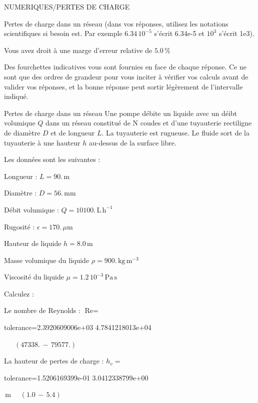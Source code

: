 \documentclass[12pt]{article}
\begin{document}
\begin{quiz}{NUMERIQUES/PERTES DE CHARGE}
\begin{cloze}{Pertes de charge dans un réseau}
(dans vos réponses, utilisez les notations scientifiques si besoin est. Par exemple $6.34\, 10^{-5}$ s'écrit 6.34e-5 et $10^{3}$ s'écrit 1e3).

Vous avez droit à une marge d'erreur relative de $5.0\, \% $

Des fourchettes indicatives vous sont fournies en face de chaque réponse. Ce ne sont que des ordres de grandeur pour vous inciter à vérifier vos calculs avant de valider vos réponses, et la bonne réponse peut sortir légèrement de l'intervalle indiqué.

\end{cloze} 


 \begin{cloze}{Pertes de charge dans un réseau} 
Une pompe débite un liquide avec un déibt volumique $Q$ dans un réseau constitué de N coudes et d'une tuyauterie rectiligne de diamètre $D$ et de longueur $L$. La tuyauterie est rugueuse. Le fluide sort de la tuyauterie à une hauteur $h$ au-dessus de la surface libre.

Les données sont les suivantes :

Longueur : $L = 90.\,  \mathrm{m} $

Diamètre : $D = 56.\,  \mathrm{mm} $

Débit volumique : $Q = 10100.\,  \mathrm{L}\,  \mathrm{h}^{-1} $

Rugosité : $\epsilon = 170.\, \mu \mathrm{m} $

Hauteur de liquide $h = 8.0\,  \mathrm{m} $

Masse volumique du liquide $\rho = 900.\,  \mathrm{kg}\,  \mathrm{m}^{-3} $

Viscosité du liquide $\mu =  1.2 \, 10^{-3} \,  \mathrm{Pa}\,  \mathrm{s} $

 

Calculez :

 

Le nombre de Reynolds : $\text{Re} =  $
\begin{numerical}[points=1] 
\item[tolerance={2.3920609006e+03}] 4.7841218013e+04 
\end{numerical} 
 $\,$ 
 $ \quad (47338. \, - \, 79577.) $ 

La hauteur de pertes de charge : $h_v =  $
\begin{numerical}[points=1] 
\item[tolerance={1.5206169399e-01}] 3.0412338799e+00 
\end{numerical} 
 $\,  \mathrm{m}$ 
 $ \quad (1.0 \, - \, 5.4) $ 


\end{cloze}
\end{quiz}
\end{document}
